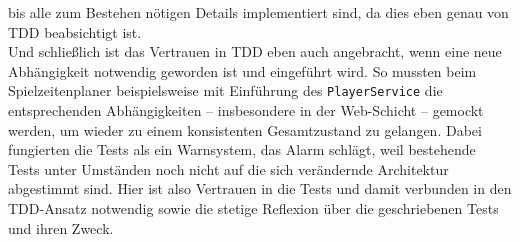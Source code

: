 bis alle zum Bestehen nötigen Details implementiert sind, da dies eben genau von TDD 
beabsichtigt ist. \\ 
Und schließlich ist das Vertrauen in TDD eben auch angebracht, wenn eine neue 
Abhängigkeit notwendig geworden ist und eingeführt wird. So mussten beim 
Spielzeitenplaner beispielsweise mit Einführung des \texttt{PlayerService} die 
entsprechenden Abhängigkeiten -- insbesondere in der Web-Schicht -- gemockt werden, um 
wieder zu einem konsistenten Gesamtzustand zu gelangen. Dabei fungierten die Tests als 
ein Warnsystem, das Alarm schlägt, weil bestehende Tests unter Umständen noch nicht auf 
die sich verändernde Architektur abgestimmt sind. Hier ist also Vertrauen in die Tests 
und damit verbunden in den TDD-Ansatz notwendig sowie die stetige Reflexion über die 
geschriebenen Tests und ihren Zweck. 

